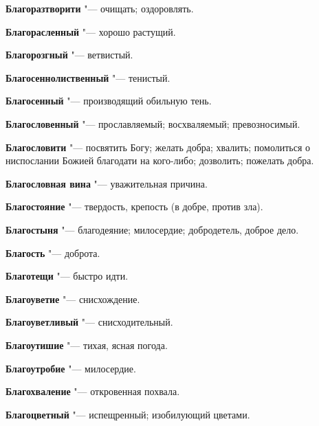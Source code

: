 \begin{mymulticols}{2}
\noindent\textbf{Благоразтворити} "--- очищать; оздоровлять. 




\noindent\textbf{Благорасленный} "--- хорошо растущий. 




\noindent\textbf{Благорозгный} "--- ветвистый. 




\noindent\textbf{Благосеннолиственный} "--- тенистый. 




\noindent\textbf{Благосенный} "--- производящий обильную тень. 




\noindent\textbf{Благословенный} "--- прославляемый; восхваляемый; превозносимый. 




\noindent\textbf{Благословити} "--- посвятить Богу; желать добра; хвалить; помолиться о ниспослании Божией благодати на кого-либо; дозволить; пожелать добра. 




\noindent\textbf{Благословная вина} "--- уважительная причина. 




\noindent\textbf{Благостояние} "--- твердость, крепость (в добре, против зла). 




\noindent\textbf{Благостыня} "--- благодеяние; милосердие; добродетель, доброе дело. 




\noindent\textbf{Благость} "--- доброта. 




\noindent\textbf{Благотещи} "--- быстро идти. 




\noindent\textbf{Благоуветие} "--- снисхождение. 




\noindent\textbf{Благоуветливый} "--- снисходительный. 




\noindent\textbf{Благоутишие} "--- тихая, ясная погода. 




\noindent\textbf{Благоутробие} "--- милосердие. 




\noindent\textbf{Благохваление} "--- откровенная похвала. 




\noindent\textbf{Благоцветный} "--- испещренный; изобилующий цветами. 





\end{mymulticols}
